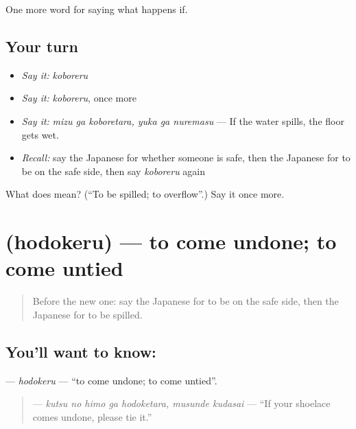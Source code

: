 \begin{grammarlens}[title={What you've built}]
One more word for saying what happens if.
\end{grammarlens}

\subsection*{Your turn}
\begin{itemize}
\raggedright
  \item \emph{Say it:} \emph{koboreru}
  \item \emph{Say it:} \emph{koboreru}, once more
  \item \emph{Say it:} \emph{mizu ga koboretara, yuka ga nuremasu} — If the water spills, the floor gets wet.
  \item \emph{Recall:} say the Japanese for whether someone is safe, then the Japanese for to be on the safe side, then say \emph{koboreru} again
\end{itemize}

\begin{tcolorbox}[breakable,colback=teal!4,colframe=teal!35!black,title={Before you move on}]
What does  mean? (\textquotedblleft{}To be spilled; to overflow\textquotedblright{}.) Say it once more.
\end{tcolorbox}
\section[\texorpdfstring{\ja{ほどける} (hodokeru)}{ほどける (hodokeru)}]{ (hodokeru) — to come undone; to come untied}

\label{lesson:JA-C352-hodokeru}



\begin{quote}
Before the new one: say the Japanese for to be on the safe side, then the Japanese for to be spilled.
\end{quote}

\subsection*{You'll want to know: }
\textbf{} — \emph{hodokeru} — \textquotedblleft{}to come undone; to come untied\textquotedblright{}.

\begin{quote}
\textbf{   } — \emph{kutsu no himo ga hodoketara, musunde kudasai} — \textquotedblleft{}If your shoelace comes undone, please tie it.\textquotedblright{}
\end{quote}

